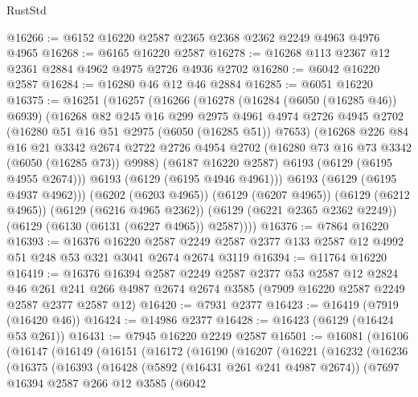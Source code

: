 \begin{lexlean}{RustStd}
\begin{coremodule}
@16266 := @6152 @16220 @2587 @2365 @2368 @2362 @2249 @4963 @4976 @4965
@16268 := @6165 @16220 @2587
@16278 := @16268 @113 @2367 @12 @2361 @2884 @4962 @4975 @2726 @4936 @2702
@16280 := @6042 @16220 @2587
@16284 := @16280 @46 @12 @46 @2884
@16285 := @6051 @16220
@16375 := @16251
    (@16257
      (@16266
        (@16278
          (@16284 (@6050 (@16285 @46)) @6939)
          (@16268
            @82
            @245
            @16
            @299
            @2975
            @4961
            @4974
            @2726
            @4945
            @2702
            (@16280 @51 @16 @51 @2975 (@6050 (@16285 @51)) @7653)
            (@16268
              @226
              @84
              @16
              @21
              @3342
              @2674
              @2722
              @2726
              @4954
              @2702
              (@16280 @73 @16 @73 @3342 (@6050 (@16285 @73)) @9988)
              (@6187 @16220 @2587)
              @6193
              (@6129 (@6195 @4955 @2674)))
            @6193
            (@6129 (@6195 @4946 @4961)))
          @6193
          (@6129 (@6195 @4937 @4962)))
        (@6202 (@6203 @4965))
        (@6129 (@6207 @4965))
        (@6129 (@6212 @4965))
        (@6129 (@6216 @4965 @2362))
        (@6129 (@6221 @2365 @2362 @2249))
        (@6129 (@6130 (@6131 (@6227 @4965)) @2587))))
@16376 := @7864 @16220
@16393 := @16376
    @16220
    @2587
    @2249
    @2587
    @2377
    @133
    @2587
    @12
    @4992
    @51
    @248
    @53
    @321
    @3041
    @2674
    @2674
    @3119
@16394 := @11764 @16220
@16419 := @16376
    @16394
    @2587
    @2249
    @2587
    @2377
    @53
    @2587
    @12
    @2824
    @46
    @261
    @241
    @266
    @4987
    @2674
    @2674
    @3585
    (@7909 @16220 @2587 @2249 @2587 @2377 @2587 @12)
@16420 := @7931 @2377
@16423 := @16419 (@7919 (@16420 @46))
@16424 := @14986 @2377
@16428 := @16423 (@6129 (@16424 @53 @261))
@16431 := @7945 @16220 @2249 @2587
@16501 := @16081
    (@16106
      (@16147
        (@16149
          (@16151
            (@16172
              (@16190
                (@16207
                  (@16221
                    (@16232
                      (@16236
                        (@16375
                          (@16393
                            (@16428
                              (@5892 (@16431 @261 @241 @4987 @2674))
                              (@7697
                                @16394
                                @2587
                                @266
                                @12
                                @3585
                                (@6042

\end{coremodule}
\end{lexlean}
